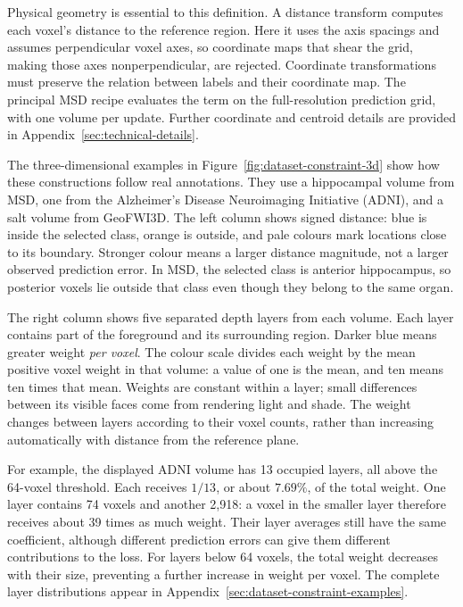\documentclass[12pt,a4paper]{article}
\begin{document}
Physical geometry is essential to this definition. A distance transform
computes each voxel's distance to the reference region. Here it uses the
axis spacings and assumes perpendicular voxel axes, so coordinate maps that
shear the grid, making those axes nonperpendicular, are rejected. Coordinate
transformations must preserve the relation between labels and their
coordinate map. The principal MSD recipe evaluates the term on the
full-resolution prediction grid, with one volume per update. Further
coordinate and centroid details are provided in
Appendix~\ref{sec:technical-details}.

The three-dimensional examples in Figure~\ref{fig:dataset-constraint-3d}
show how these constructions follow real annotations. They use a hippocampal
volume from MSD, one from the Alzheimer's Disease Neuroimaging Initiative
(ADNI), and a salt volume from GeoFWI3D. The left column shows signed
distance: blue is inside the selected class, orange is outside, and pale
colours mark locations close to its boundary. Stronger colour means a
larger distance magnitude, not a larger observed prediction error. In MSD,
the selected class is anterior hippocampus, so posterior voxels lie outside
that class even though they belong to the same organ.

The right column shows five separated depth layers from each volume.
Each layer contains part of the foreground and its surrounding region.
Darker blue means greater weight \emph{per voxel}. The colour scale divides
each weight by the mean positive voxel weight in that volume: a value of
one is the mean, and ten means ten times that mean. Weights are constant
within a layer; small differences between its visible faces come from
rendering light and shade. The weight changes between layers according to
their voxel counts, rather than increasing automatically with distance
from the reference plane.

For example, the displayed ADNI volume has 13 occupied layers, all above
the 64-voxel threshold. Each receives $1/13$, or about $7.69\%$, of the
total weight. One layer contains 74 voxels and another 2,918: a voxel in
the smaller layer therefore receives about 39 times as much weight.
Their layer averages still have the same coefficient, although different
prediction errors can give them different contributions to the loss.
For layers below 64 voxels, the total weight decreases with their size,
preventing a further increase in weight per voxel. The complete layer
distributions appear in Appendix~\ref{sec:dataset-constraint-examples}.
\end{document}
